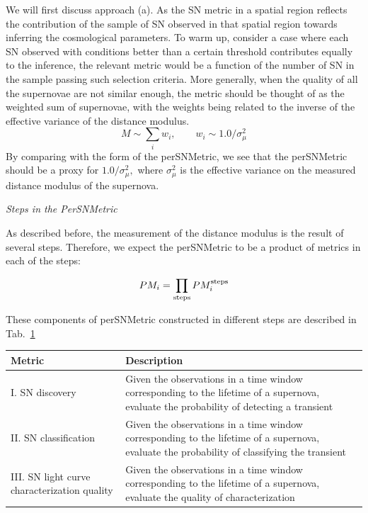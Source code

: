 We will first discuss approach (a).
As the SN metric in a spatial region reflects the contribution of the sample
of SN observed in that spatial region towards inferring the cosmological
parameters. To warm up, consider a case where each SN observed with conditions better than a certain threshold contributes equally to the inference, the
relevant metric would be a function of the number of SN in the sample passing
such selection criteria. More generally, when the quality of all the supernovae are not similar enough, the metric should be thought of as the weighted sum of supernovae, with the weights being related to the inverse of the effective 
variance of the distance modulus.
\begin{equation}
M\sim \sum_i w_i , \qquad  w_i \sim 1.0 /\sigma^2_\mu
\end{equation}
By comparing with the form of the perSNMetric, we see that the perSNMetric
should be a proxy for $1.0/\sigma^2_\mu,$ where $\sigma^2_\mu$ is the effective variance on the measured distance modulus of the supernova.

{\it  Steps in the PerSNMetric}

As described before, the measurement of the distance modulus is the result of several steps. Therefore, we expect the perSNMetric to be a product of metrics in each of the steps:

\begin{equation}
PM_i = \prod_{\rm{steps}} PM_i^{\rm{steps}}
\end{equation}

These components of perSNMetric constructed in different steps are described in Tab.~\ref{tab:stepsAndMetrics}
\begin{center}
 \begin{table}
\begin{tabular}{| p{5cm} |p{10cm}| }
\hline Metric & Description \\
\hline
I. SN discovery  &  Given the observations in a time window corresponding to the lifetime of a supernova, evaluate the  probability of detecting a
transient \\
II. SN classification & Given the observations in a time window corresponding to the lifetime of a supernova, evaluate the probability of classifying the transient\\
III. SN light curve characterization quality & Given the observations in a time window corresponding to the lifetime of a supernova, evaluate the quality of characterization\\
\hline \end{tabular}
\label{tab:stepsAndMetrics}
\end{table}
\end{center}



